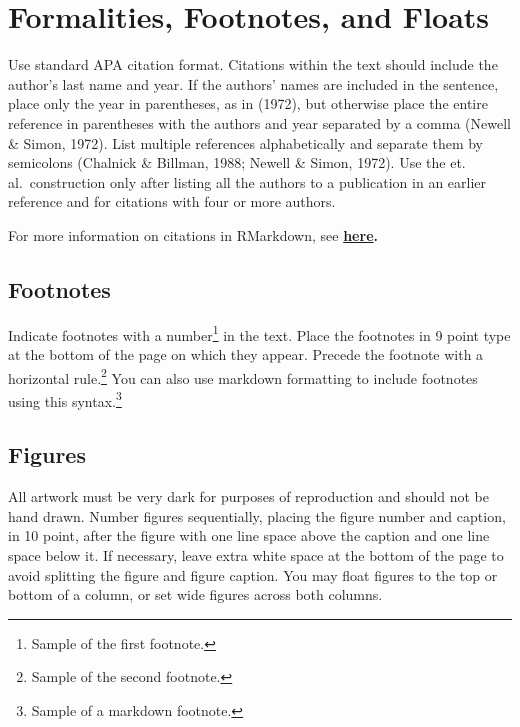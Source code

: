 \documentclass[10pt, letterpaper]{article}
\begin{document}
\hypertarget{formalities-footnotes-and-floats}{%
\section{Formalities, Footnotes, and
Floats}\label{formalities-footnotes-and-floats}}

Use standard APA citation format. Citations within the text should
include the author's last name and year. If the authors' names are
included in the sentence, place only the year in parentheses, as in
(1972), but otherwise place the entire reference in parentheses with the
authors and year separated by a comma (Newell \& Simon, 1972). List
multiple references alphabetically and separate them by semicolons
(Chalnick \& Billman, 1988; Newell \& Simon, 1972). Use the et.
al.~construction only after listing all the authors to a publication in
an earlier reference and for citations with four or more authors.

For more information on citations in RMarkdown, see
\textbf{\href{http://rmarkdown.rstudio.com/authoring_bibliographies_and_citations.html\#citations}{here}.}

\hypertarget{footnotes}{%
\subsection{Footnotes}\label{footnotes}}

Indicate footnotes with a number\footnote{Sample of the first
footnote.} in the text. Place the footnotes in 9 point type at the
bottom of the page on which they appear. Precede the footnote with a
horizontal rule.\footnote{Sample of the second footnote.} You can also
use markdown formatting to include footnotes using this
syntax.\footnote{Sample of a markdown footnote.}

\hypertarget{figures}{%
\subsection{Figures}\label{figures}}

All artwork must be very dark for purposes of reproduction and should
not be hand drawn. Number figures sequentially, placing the figure
number and caption, in 10 point, after the figure with one line space
above the caption and one line space below it. If necessary, leave extra
white space at the bottom of the page to avoid splitting the figure and
figure caption. You may float figures to the top or bottom of a column,
or set wide figures across both columns.
\end{document}
